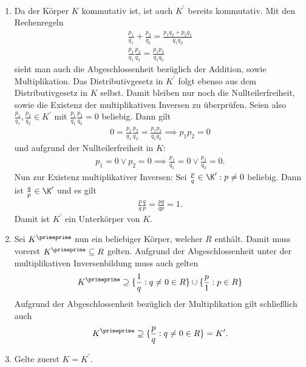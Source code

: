 \begin{solution}
\leavevmode \\
\begin{enumerate}
  \item Da der Körper $K$ kommutativ ist, ist auch $K^{\prime}$ bereits kommutativ.
  Mit den Rechenregeln
  \begin{align*}
    \frac{p_1}{q_1} + \frac{p_2}{q_2} = \frac{p_1q_2 + p_2q_1}{q_1q_2} \\
    \frac{p_1}{q_1}   \frac{p_2}{q_2} = \frac{p_1p_2}{q_1q_2}
  \end{align*}
  sieht man auch die Abgeschlossenheit bezüglich der Addition, sowie Multiplikation.
  Das Distributivgesetz in $K^{\prime}$ folgt ebenso aus dem Distributivgesetz in $K$ selbst.
  Damit bleiben nur noch die Nullteilerfreiheit, sowie die Existenz der multiplikativen Inversen zu überprüfen.
  Seien also $\frac{p_1}{q_1}, \frac{p_2}{q_2} \in K^{\prime}$ mit $\frac{p_1}{q_1}   \frac{p_2}{q_2} = 0$ beliebig.
  Dann gilt
  \begin{align*}
    0 = \frac{p_1}{q_1}   \frac{p_2}{q_2} = \frac{p_1p_2}{q_1q_2} \implies p_1p_2 = 0
  \end{align*}
  und aufgrund der Nullteilerfreiheit in $K:$
  \begin{align*}
    p_1 = 0 \lor p_2 = 0 \implies \frac{p_1}{q_1} = 0 \lor \frac{p_2}{q_2} = 0.
  \end{align*}
  Nun zur Existenz multiplikativer Inversen: Sei $\frac{p}{q} \in \K^{\prime}: p \neq 0$ beliebig.
  Dann ist $\frac{q}{p} \in \K^{\prime}$ und es gilt
  \begin{align*}
    \frac{p}{q}\frac{q}{p} = \frac{pq}{qp} = 1.
  \end{align*}
  Damit ist $K^{\prime}$ ein Unterkörper von $K$.
  \item Sei $K^{\primeprime}$ nun ein beliebiger Körper, welcher $R$ enthält.
  Damit muss vorerst $K^{\primeprime} \subseteq R$ gelten. Aufgrund der Abgeschlossenheit
  unter der multiplikativen Inversenbildung muss auch gelten
  \begin{align*}
    K^{\primeprime} \supseteq \{\frac{1}{q}: q \neq 0 \in R\} \cup \{\frac{p}{1}: p \in R\}
  \end{align*}
  Aufgrund der Abgeschlossenheit bezüglich der Multiplikation gilt schließlich auch
  \begin{align*}
    K^{\primeprime} \supseteq  \{\frac{p}{q}: q \neq 0 \in R\} = K^{\prime}.
  \end{align*}
  \item Gelte zuerst $K = K^{\prime}$. \\

\end{enumerate}
\end{solution}
